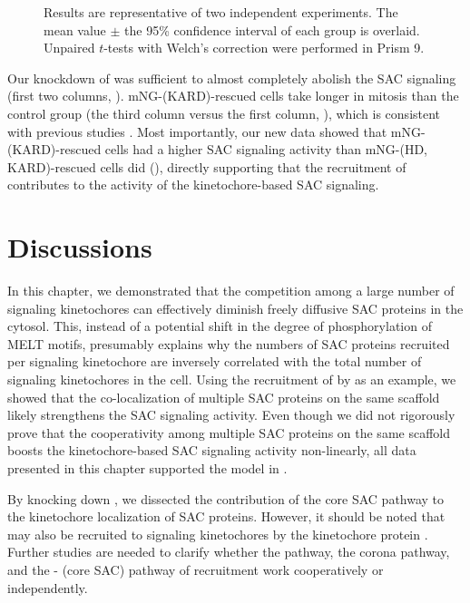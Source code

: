 \begin{figure} [t!]
Results are representative of two independent experiments. The mean value $\pm$ the 95\% confidence interval of each group is overlaid. Unpaired $t$-tests with Welch's correction were performed in Prism 9.
\end{figure}

Our knockdown of  was sufficient to almost completely abolish the SAC signaling (first two columns, ). mNG-(\textDelta{}KARD)-rescued cells take longer in mitosis than the control group (the third column versus the first column, ), which is consistent with previous studies \cite{PP2A-B56, BUBR1-L669A+I672A}. Most importantly, our new data showed that mNG-(\textDelta{}KARD)-rescued cells had a higher SAC signaling activity than mNG-(\textDelta{}HD, \textDelta{}KARD)-rescued cells did (), directly supporting that the recruitment of   contributes to the activity of the kinetochore-based SAC signaling.

\section{Discussions}
\label{Chapter3Discussions}

In this chapter, we demonstrated that the competition among a large number of signaling kinetochores can effectively diminish freely diffusive SAC proteins in the cytosol. This, instead of a potential shift in the degree of phosphorylation of MELT motifs, presumably explains why the numbers of SAC proteins recruited per signaling kinetochore are inversely correlated with the total number of signaling kinetochores in the cell. Using the recruitment of  by  as an example, we showed that the co-localization of multiple SAC proteins on the same  scaffold likely strengthens the SAC signaling activity. Even though we did not rigorously prove that the cooperativity among multiple SAC proteins on the same  scaffold boosts the kinetochore-based SAC signaling activity non-linearly, all data presented in this chapter supported the model in .

By knocking down , we dissected the contribution of the core SAC pathway to the kinetochore localization of SAC proteins. However, it should be noted that  may also be recruited to signaling kinetochores by the kinetochore protein  \cite{MIS12-CEP57-MAD1-MAD2}. Further studies are needed to clarify whether the  pathway, the corona pathway, and the - (core SAC) pathway of  recruitment work cooperatively or independently.

